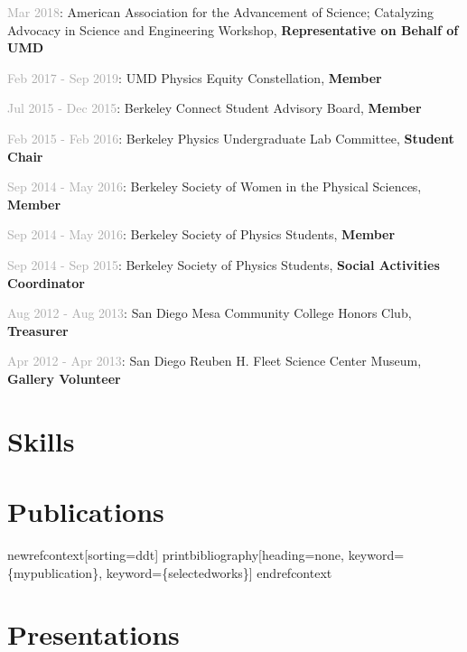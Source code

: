 \documentclass[
  10pt,
  letterpaper,
  DIV=11,
  numbers=noendperiod]{scrartcl}
\begin{document}
\textcolor{darkgray}{Mar 2018}: American Association for the Advancement
of Science; Catalyzing Advocacy in Science and Engineering Workshop,
\textbf{Representative on Behalf of UMD}

\textcolor{darkgray}{Feb 2017 - Sep 2019}: UMD Physics Equity
Constellation, \textbf{Member}

\textcolor{darkgray}{Jul 2015 - Dec 2015}: Berkeley Connect Student
Advisory Board, \textbf{Member}

\textcolor{darkgray}{Feb 2015 - Feb 2016}: Berkeley Physics
Undergraduate Lab Committee, \textbf{Student Chair}

\textcolor{darkgray}{Sep 2014 - May 2016}: Berkeley Society of Women in
the Physical Sciences, \textbf{Member}

\textcolor{darkgray}{Sep 2014 - May 2016}: Berkeley Society of Physics
Students, \textbf{Member}

\textcolor{darkgray}{Sep 2014 - Sep 2015}: Berkeley Society of Physics
Students, \textbf{Social Activities Coordinator}

\textcolor{darkgray}{Aug 2012 - Aug 2013}: San Diego Mesa Community
College Honors Club, \textbf{Treasurer}

\textcolor{darkgray}{Apr 2012 - Apr 2013}: San Diego Reuben H. Fleet
Science Center Museum, \textbf{Gallery Volunteer}

\hypertarget{fa-tools-skills}{%
\section{\texorpdfstring{
Skills}{ Skills}}\label{fa-tools-skills}}

\hypertarget{fa-pen-nib-publications}{%
\section{\texorpdfstring{
Publications}{ Publications}}\label{fa-pen-nib-publications}}

newrefcontext{[}sorting=ddt{]} printbibliography{[}heading=none,
keyword=\{mypublication\}, keyword=\{selectedworks\}{]} endrefcontext

\hypertarget{fa-chart-bar-presentations}{%
\section{\texorpdfstring{
Presentations}{ Presentations}}\label{fa-chart-bar-presentations}}
\end{document}

